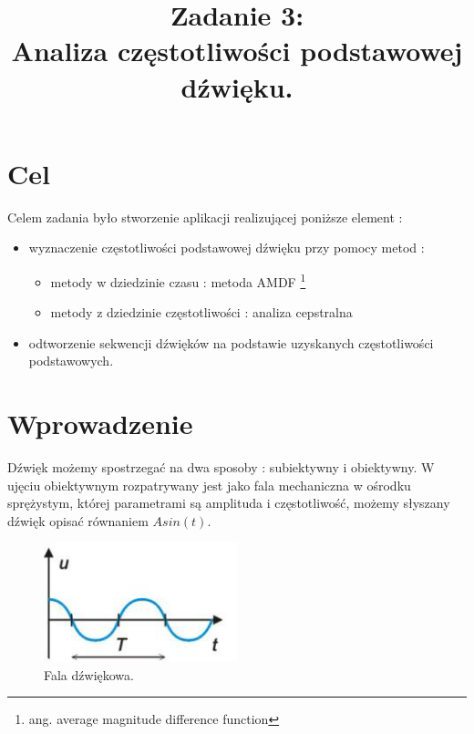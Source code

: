 \documentclass{classrep}
\author{
  \studentinfo{Paweł Musiał}{178726} \and
  \studentinfo{Łukasz Michalski}{178724}
}
\title{Zadanie 3:\\  \textbf {Analiza częstotliwości podstawowej dźwięku.}}
\begin{document}
\maketitle

\addtocounter{footnote}{1}

\tableofcontents

\section{Cel}

Celem zadania było stworzenie aplikacji realizującej poniższe element :
\begin{itemize}

\item wyznaczenie częstotliwości podstawowej dźwięku przy pomocy metod :
\begin{itemize}
\item metody w dziedzinie czasu : metoda AMDF \footnote{ang. average magnitude difference function
}
\item metody z dziedzinie częstotliwości : analiza cepstralna
\end{itemize}
\item odtworzenie sekwencji dźwięków na podstawie uzyskanych częstotliwości podstawowych.
\end{itemize}


\section{Wprowadzenie}
Dźwięk możemy spostrzegać na dwa sposoby : subiektywny i obiektywny. W ujęciu obiektywnym rozpatrywany jest jako fala mechaniczna w ośrodku sprężystym, której parametrami są amplituda i częstotliwość, możemy słyszany dźwięk opisać równaniem $Asin(t)$. 

\begin{figure}[H]
  \centering
  \includegraphics[width=0.5\textwidth]{Asin}
  \caption{Fala dźwiękowa.}
  \label{fig_dzwiek}
\end{figure}
\end{document}
